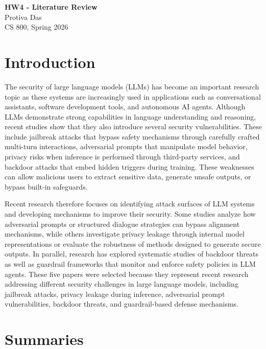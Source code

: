\documentclass[12pt]{article}
\begin{document}
\begin{centering}
{\large\textbf{HW4 - Literature Review}}\\
\vspace{3mm}
Protiva Das\\
CS 800, Spring 2026\\
\end{centering}

\section{Introduction}

The security of large language models (LLMs) has become an important research topic as these systems are increasingly used in applications such as conversational assistants, software development tools, and autonomous AI agents. Although LLMs demonstrate strong capabilities in language understanding and reasoning, recent studies show that they also introduce several security vulnerabilities. These include jailbreak attacks that bypass safety mechanisms through carefully crafted multi-turn interactions, adversarial prompts that manipulate model behavior, privacy risks when inference is performed through third-party services, and backdoor attacks that embed hidden triggers during training. These weaknesses can allow malicious users to extract sensitive data, generate unsafe outputs, or bypass built-in safeguards.

Recent research therefore focuses on identifying attack surfaces of LLM systems and developing mechanisms to improve their security. Some studies analyze how adversarial prompts or structured dialogue strategies can bypass alignment mechanisms, while others investigate privacy leakage through internal model representations or evaluate the robustness of methods designed to generate secure outputs. In parallel, research has explored systematic studies of backdoor threats as well as guardrail frameworks that monitor and enforce safety policies in LLM agents. These five papers were selected because they represent recent research addressing different security challenges in large language models, including jailbreak attacks, privacy leakage during inference, adversarial prompt vulnerabilities, backdoor threats, and guardrail-based defense mechanisms.

\section{Summaries}
\end{document}
